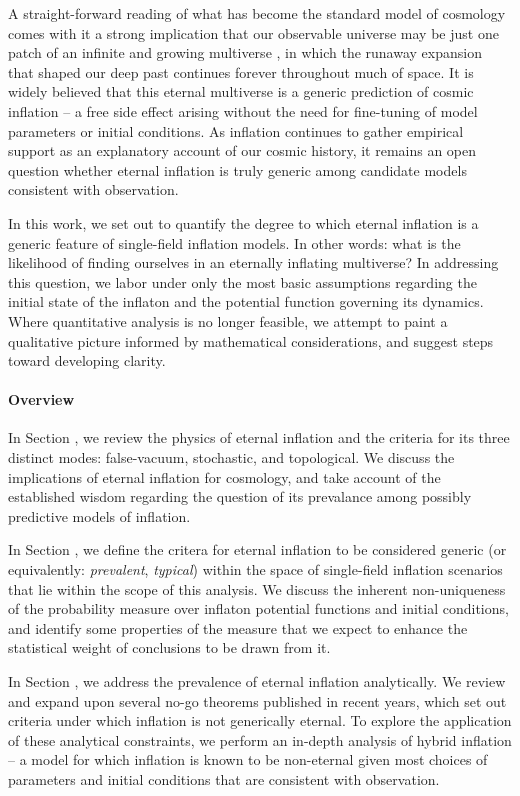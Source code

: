 
A straight-forward reading of what has become the standard model of cosmology comes with it a strong implication that our observable universe may be just one patch of an infinite and growing multiverse
, in which the runaway expansion that shaped our deep past continues forever throughout much of space.  It is widely believed that this eternal multiverse is a generic prediction of cosmic inflation -- a free side effect arising without the need for fine-tuning of model parameters or initial conditions.  As inflation continues to gather empirical support as an explanatory account of our cosmic history, it remains an open question whether eternal inflation is truly generic among candidate models consistent with observation.

In this work, we set out to quantify the degree to which eternal inflation is a generic feature of single-field inflation models.  In other words: what is the likelihood of finding ourselves in an eternally inflating multiverse?  In addressing this question, we labor under only the most basic assumptions regarding the initial state of the inflaton and the potential function governing its dynamics.  Where quantitative analysis is no longer feasible, we attempt to paint a qualitative picture informed by mathematical considerations, and suggest steps toward developing clarity.

\paragraph{Overview}

In Section , we review the physics of eternal inflation and the criteria for its three distinct modes: false-vacuum, stochastic, and topological.  We discuss the implications of eternal inflation for cosmology, and take account of the established wisdom regarding the question of its prevalance among possibly predictive models of inflation.

In Section , we define the critera for eternal inflation to be considered {generic} (or equivalently: {\it prevalent}, {\it typical}) within the space of single-field inflation scenarios that lie within the scope of this analysis.  
We discuss the inherent non-uniqueness of the probability measure over inflaton potential functions and initial conditions, and identify some properties of the measure that we expect to enhance the statistical weight of conclusions to be drawn from it.

In Section , we address the prevalence of eternal inflation analytically.  
We review and expand upon several no-go theorems published in recent years, which set out criteria under which inflation is not generically eternal.  
To explore the application of these analytical constraints, we perform an in-depth analysis of hybrid inflation -- a model for which inflation is known to be non-eternal given most choices of parameters and initial conditions that are consistent with observation.

